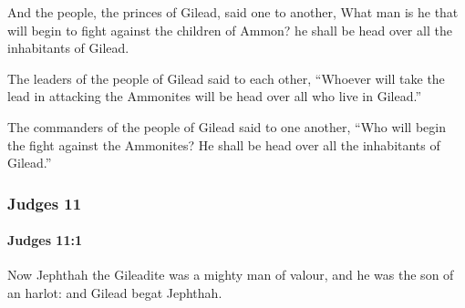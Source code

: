			\begin{versebox}
					\item[BHS] 
					\item[ASV] And the people, the princes of Gilead, said one to another, What man is he that will begin to fight against the children of Ammon? he shall be head over all the inhabitants of Gilead.
					\item[NIV] The leaders of the people of Gilead said to each other, “Whoever will take the lead in attacking the Ammonites will be head over all who live in Gilead.”
					\item[NRSV] The commanders of the people of Gilead said to one another, “Who will begin the fight against the Ammonites? He shall be head over all the inhabitants of Gilead.”
			\end{versebox}
	\subsubsection{Judges 11} %
		\label{JUDGES-11}

		\paragraph{Judges 11:1} %
			\label{JUDGES-11-1}

			Now Jephthah the Gileadite was a mighty man of valour, and he was the son of an harlot: and Gilead begat Jephthah.

